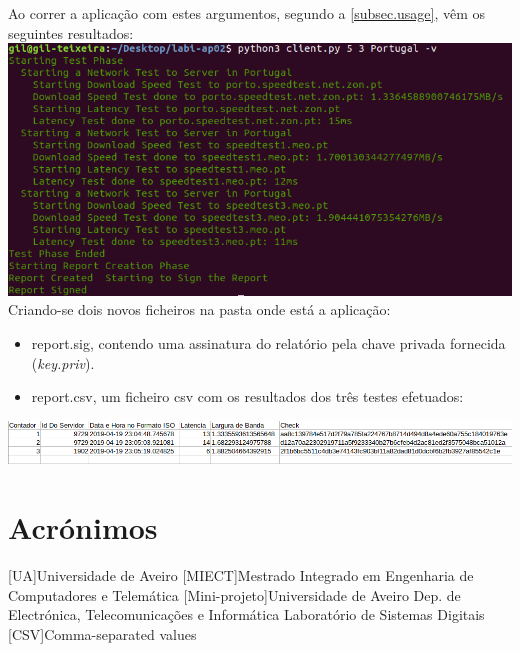 \documentclass{report}
\begin{document}
Ao correr a aplicação com estes argumentos, segundo a \autoref{subsec.usage}, vêm os seguintes resultados:\\
\includegraphics[width=\textwidth]{useExample}
Criando-se dois novos ficheiros na pasta onde está a aplicação:
\begin{itemize}
\item report.sig, contendo uma assinatura do relatório pela chave privada fornecida (\textit{key.priv}).
\item report.csv, um ficheiro \ac{csv} com os resultados dos três testes efetuados:
\end{itemize}
\includegraphics[width=\textwidth]{reportcsv}



\chapter*{Acrónimos}
\begin{acronym}
[UA]{Universidade de Aveiro}
[MIECT]{Mestrado Integrado em Engenharia de Computadores e Telemática}
[Mini-projeto]{Universidade de Aveiro
		Dep. de Electrónica, Telecomunicações e Informática
		Laboratório de Sistemas Digitais}
[CSV]{Comma-separated values}
\end{acronym}



\end{document}
